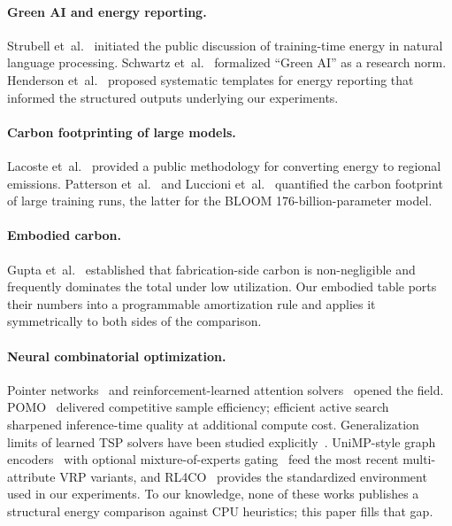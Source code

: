 \documentclass[11pt]{article}
\begin{document}
\paragraph{Green AI and energy reporting.} Strubell
et~al.~\cite{strubell2019energy} initiated the public discussion of training-time energy in natural language processing. Schwartz et~al.~\cite{schwartz2020green} formalized ``Green AI'' as a research norm. Henderson et~al.~\cite{henderson2020systematic} proposed systematic templates for energy reporting that informed the structured outputs underlying our experiments.

\paragraph{Carbon footprinting of large models.} Lacoste
et~al.~\cite{lacoste2019quantifying} provided a public methodology for converting energy to regional emissions. Patterson et~al.~\cite{patterson2021carbon} and Luccioni et~al.~\cite{luccioni2023bloom} quantified the carbon footprint of large training runs, the latter for the BLOOM 176-billion-parameter model.

\paragraph{Embodied carbon.}
Gupta et~al.~\cite{gupta2021chasing,wu2022sustainable} established that fabrication-side carbon is non-negligible and frequently dominates the total under low utilization. Our embodied table ports their numbers into a programmable amortization rule and applies it symmetrically to both sides of the comparison.

\paragraph{Neural combinatorial optimization.} Pointer
networks~\cite{vinyals2015pointer} and reinforcement-learned attention solvers~\cite{bello2017neural,kool2019attention} opened the field. POMO~\cite{kwon2020pomo} delivered competitive sample efficiency; efficient active search~\cite{hottung2022efficient} sharpened inference-time quality at additional compute cost. Generalization limits of learned TSP solvers have been studied explicitly~\cite{joshi2022learning}. UniMP-style graph encoders~\cite{shi2021unimp} with optional mixture-of-experts gating~\cite{shazeer2017outrageously} feed the most recent multi-attribute VRP variants, and RL4CO~\cite{berto2024rl4co} provides the standardized environment used in our experiments. To our knowledge, none of these works publishes a structural energy comparison against CPU heuristics; this paper fills that gap.
\end{document}
